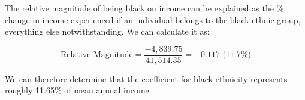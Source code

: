 
The relative magnitude of being black on income can be explained as the \% change in income experienced if an individual belongs to the black ethnic group, everything else notwithstanding. We can calculate it as:

\vspace{-1em}

\begin{equation}
    \text{Relative Magnitude} = \frac{-4,839.75}{41,514.35} = -0.117 \text{ (11.7\%)}
\end{equation}

We can therefore determine that the coefficient for black ethnicity represents roughly 11.65\% of mean annual income.